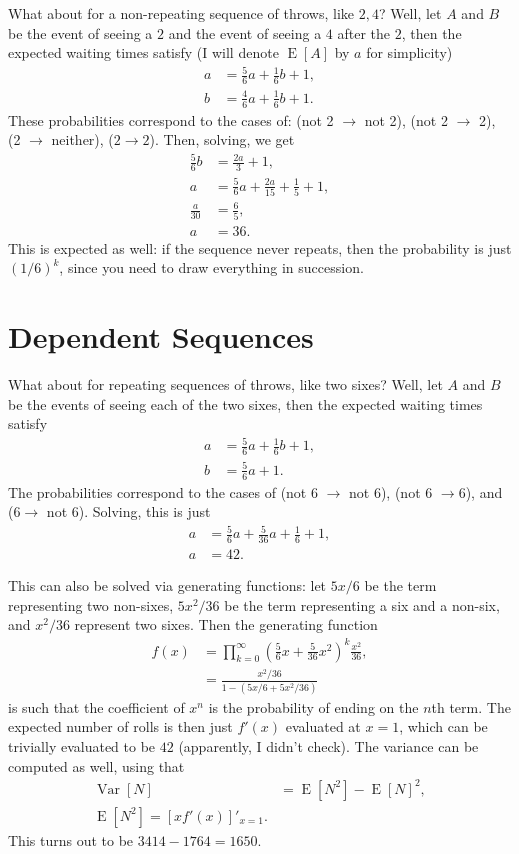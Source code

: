 \documentclass[12pt]{report}
\newcommand*{\p}[1]{\left(#1\right)}
\newcommand*{\s}[1]{\left[#1\right]}
\DeclareMathOperator{\E}{E}
\DeclareMathOperator{\Var}{Var}
\begin{document}
What about for a non-repeating sequence of throws, like $2, 4$? Well, let $A$
and $B$ be the event of seeing a $2$ and the event of seeing a $4$ after the
$2$, then the expected waiting times satisfy (I will denote $\E[A]$ by $a$ for
simplicity)
\begin{align}
    a &= \frac{5}{6}a + \frac{1}{6}b + 1,\nonumber\\
    b &= \frac{4}{6}a + \frac{1}{6}b + 1.
\end{align}
These probabilities correspond to the cases of: (not 2 $\to$ not 2),
(not 2 $\to$ 2), (2 $\to$ neither), ($2 \to 2$). Then, solving, we get
\begin{align}
    \frac{5}{6}b &= \frac{2a}{3} + 1,\\
    a &= \frac{5}{6}a + \frac{2a}{15} + \frac{1}{5} + 1,\\
    \frac{a}{30} &= \frac{6}{5},\\
    a &= 36.
\end{align}
This is expected as well: if the sequence never repeats, then the probability is
just $(1/6)^k$, since you need to draw everything in succession.

\section{Dependent Sequences}

What about for repeating sequences of throws, like two sixes? Well, let $A$ and
$B$ be the events of seeing each of the two sixes, then the expected waiting
times satisfy
\begin{align}
    a &= \frac{5}{6}a + \frac{1}{6}b + 1,\nonumber\\
    b &= \frac{5}{6}a + 1.
\end{align}
The probabilities correspond to the cases of (not 6 $\to$ not 6), (not 6 $\to
6$), and ($6 \to$ not 6). Solving, this is just
\begin{align}
    a &= \frac{5}{6}a + \frac{5}{36}a + \frac{1}{6} + 1,\\
    a &= 42.
\end{align}

This can also be solved via generating functions: let $5x/6$ be the term
representing two non-sixes, $5x^2/36$ be the term representing a six and a
non-six, and $x^2/36$ represent two sixes. Then the generating function
\begin{align}
    f(x) &= \prod_{k = 0}^\infty
            \p{\frac{5}{6}x + \frac{5}{36}x^2}^k\frac{x^2}{36},\\
        &= \frac{x^2/36}{1 - \p{5x/6 + 5x^2/36}}
\end{align}
is such that the coefficient of $x^n$ is the probability of ending on the $n$th
term. The expected number of rolls is then just $f'(x)$ evaluated at $x = 1$,
which can be trivially evaluated to be $42$ (apparently, I didn't check). The
variance can be computed as well, using that
\begin{align}
    \Var[N] &= \E[N^2] - \E[N]^2,\nonumber\\
    \E[N^2] = \s{xf'(x)}'_{x = 1}.
\end{align}
This turns out to be $3414 - 1764 = 1650$.
\end{document}
